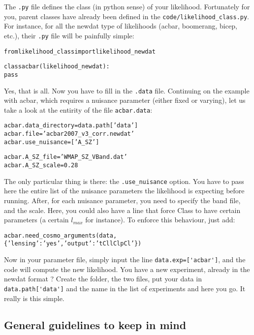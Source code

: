 \documentclass[10pt]{article}
\begin{document}
  The \verb?.py? file defines the class (in python sense) of your likelihood.
  Fortunately for you, parent classes have already been defined in the
  \verb?code/likelihood_class.py?. For instance, for all the newdat type of
  likelihoods (acbar, boomerang, bicep, etc.), their \verb?.py? file will be
  painfully simple:

  \begin{alltt}
  from likelihood_class import likelihood_newdat

  class acbar(likelihood_newdat):
    pass
  \end{alltt}

  Yes, that is all. Now you have to fill in the \verb?.data? file. Continuing
  on the example with acbar, which requires a nuisance parameter (either fixed
  or varying), let us take a look at the entirity of the file
  \verb?acbar.data?:
  
  \begin{alltt}
    acbar.data_directory = data.path['data']
    acbar.file           = 'acbar2007_v3_corr.newdat'
    acbar.use_nuisance   = ['A_SZ']

    acbar.A_SZ_file      = 'WMAP_SZ_VBand.dat'
    acbar.A_SZ_scale     = 0.28
  \end{alltt}

  The only particular thing is there: the \verb?.use_nuisance? option. You have
  to pass here the entire list of the nuisance parameters the likelihood is
  expecting before running. After, for each nuisance parameter, you need to
  specify the band file, and the scale. Here, you could also have a line that
  force Class to have certain parameters (a certain $l_{max}$ for instance). To
  enforce this behaviour, just add:
  \begin{alltt}
    acbar.need_cosmo_arguments(data,\{'lensing':'yes', 'output':'tCl lCl pCl'\})
  \end{alltt}

  Now in your parameter file, simply input the line \verb?data.exp=['acbar']?,
  and the code will compute the new likelihood. You have a new experiment,
  already in the newdat format ? Create the folder, the two files, put your
  data in \verb?data.path['data']? and the name in the list of experiments and
  here you go. It really is this simple.

  \subsection{General guidelines to keep in mind}
\end{document}
